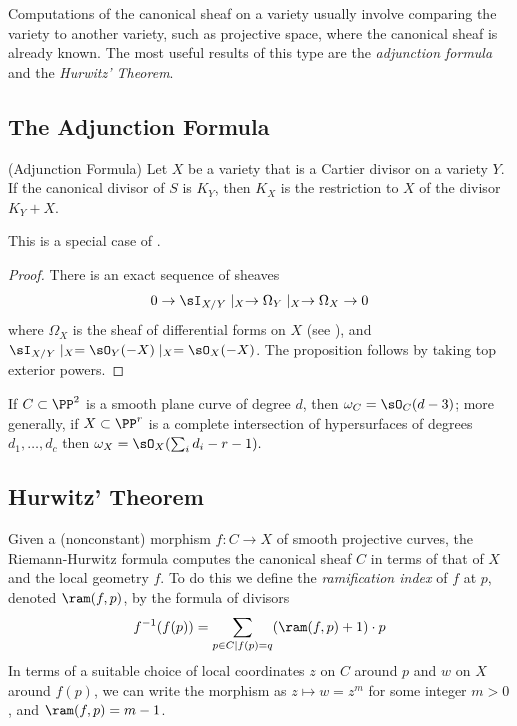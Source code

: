 Computations of the canonical sheaf on a variety usually involve comparing the variety to another variety, such as projective space, where the canonical sheaf is already known. The most useful results of this type are  the \emph{adjunction formula}
and the \emph{Hurwitz' Theorem}.

\subsection{The Adjunction Formula}
\begin{proposition}\label{adjunction}(Adjunction Formula)
 Let $X$ be a variety that is a Cartier divisor on a variety $Y$. If the canonical divisor of $S$ is $K_{Y}$, then
 $K_{X}$ is the restriction to $X$ of the divisor $K_{Y}+X$.
\end{proposition}
This is a special case of \cite[****]{H}.
\begin{proof}
 There is an exact sequence of sheaves
 $$
0\to  \sI_{X/Y}\mid_{X} \to \Omega_{Y}\mid _{X} \to \Omega_{X} \to 0
 $$
 where $\Omega_{X}$ is the sheaf of differential forms on $X$ (see \cite[Theorem ***]{Eisenbud95}), and
$ \sI_{X/Y}\mid_{X} = \sO_{Y}(-X)\mid_{X} = \sO_{X}(-X)$. The proposition follows by taking top exterior powers.
\end{proof}

\begin{corollary}\label{canonical of plane curve}
If $C\subset \PP^{2}$ is a smooth plane curve of degree $d$, then $\omega_{C} = \sO_{C}(d-3)$; more generally, if
$X\subset \PP^{r}$ is a complete intersection of hypersurfaces of degrees $d_{1},\dots, d_{c}$ then
$\omega_{X} = \sO_{X}(\sum_{i}d_{i }-r-1).$
\end{corollary}

\subsection{Hurwitz' Theorem}
 Given a (nonconstant) morphism $f : C \to X$ of smooth projective curves, the Riemann-Hurwitz formula computes the canonical sheaf  $C$ in terms of that of  $X$ and the local geometry $f$. To do this we define the
\emph{ramification index} of $f$ at $p$,  denoted $\ram(f,p)$, by the formula of divisors
$$
 f^{-1}(f(p)) = \sum_{p\in C \mid f(p)=q} (\ram(f,p)+1)\cdot p
 $$
In terms of a suitable choice of local coordinates $z$ on $C$ around $p$ and $w$ on $X$ around $f(p)$, we can write the morphism as $z \mapsto w = z^m$ for some integer $m > 0$, and $\ram(f,p) = m-1$.

